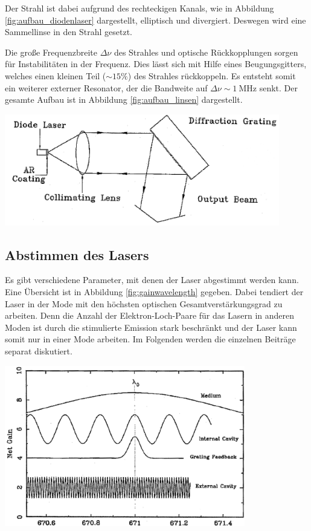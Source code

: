 \documentclass[captions=tableheading]{scrartcl}
\begin{document}
Der Strahl ist dabei aufgrund des rechteckigen Kanals, wie in Abbildung \ref{fig:aufbau_diodenlaser} dargestellt, elliptisch und divergiert. 
Deswegen wird eine Sammellinse in den Strahl gesetzt.

Die große Frequenzbreite $\Delta \nu$ des Strahles und optische Rückkopplungen sorgen für Instabilitäten in der Frequenz. Dies lässt sich mit Hilfe eines Beugungsgitters, welches einen kleinen Teil ($\sim 15\%$) des Strahles rückkoppeln. Es entsteht somit ein weiterer externer Resonator, der die Bandweite auf $\Delta\nu\sim\SI{1}{\mega\hertz}$ senkt. Der gesamte Aufbau ist in Abbildung \ref{fig:aufbau_linsen} dargestellt. 
\begin{center}
	\includegraphics[width=12cm]{images/aufbau_linse.png}
	\label{fig:aufbau_linsen}
\end{center}

\subsection{Abstimmen des Lasers} 
Es gibt verschiedene Parameter, mit denen der Laser abgestimmt werden kann. Eine Übersicht ist in Abbildung \ref{fig:gainwavelength} gegeben. 
Dabei tendiert der Laser in der Mode mit den höchsten optischen Gesamtverstärkungsgrad zu arbeiten.
Denn die Anzahl der Elektron-Loch-Paare für das Lasern in anderen Moden ist durch die stimulierte Emission stark beschränkt und der Laser kann somit nur in einer Mode arbeiten. 
Im Folgenden werden die einzelnen Beiträge separat diskutiert.

\begin{center}
	\includegraphics[width=10.5cm]{images/gainwavelength.png}
	\label{fig:gainwavelength}
\end{center}
\end{document}
